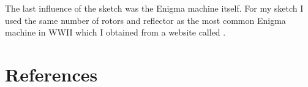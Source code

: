 \documentclass[12pt,a4paper]{article}
\begin{document}
		\begin{center}
			\\
			\vspace{0.5cm}
			\\
		\end{center}
		\vspace{0.5cm}
		The last influence of the sketch was the Enigma machine itself. For my sketch I used the same 
		number of rotors and reflector as the most common Enigma machine in WWII which I obtained from 
		a website called \textcite{CryptoMuseum2023}.
	
	\newpage

	\section{References}
	\printbibliography[heading=bibempty]
\end{document}
